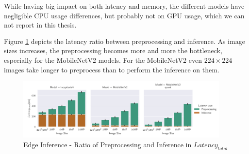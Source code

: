 While having big impact on both latency and memory, the different models have 
negligible CPU usage differences, but probably not on GPU usage, which we can not report in this thesis.





Figure \ref{fig:EdgeInferenceRatio} depicts the latency ratio between preprocessing and inference.
As image sizes increases, the preprocessing becomes more and more the bottleneck, especially for the MobileNetV2 models.
For the MobileNetV2 even $224\times224$ images take longer to preprocess than to perform the inference on them.
\begin{figure}[H]
\centering
\includegraphics[width=0.95\textwidth]{./Bilder/single_plots/edge_inference_plots/Edge_Preprocessing_+_Inference.pdf}
\caption{Edge Inference - Ratio of Preprocessing and Inference in $Latency_{total}$}
\label{fig:EdgeInferenceRatio}
\end{figure}


